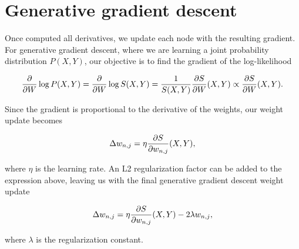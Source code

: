 \section{Generative gradient descent}

Once computed all derivatives, we update each node with the resulting gradient. For generative
gradient descent, where we are learning a joint probability distribution $P(X,Y)$, our objective is
to find the gradient of the log-likelihood

\begin{equation*}
  \frac{\partial}{\partial W}\log P(X,Y)=\frac{\partial}{\partial W}\log S(X,Y)=\frac{1}{S(X,Y)}\frac{\partial S}{\partial W}(X,Y)\propto
    \frac{\partial S}{\partial W}(X,Y).
\end{equation*}

Since the gradient is proportional to the derivative of the weights, our weight update becomes

\begin{equation*}
  \Delta w_{n,j}=\eta\frac{\partial S}{\partial w_{n,j}}(X, Y),
\end{equation*}

where $\eta$ is the learning rate. An L2 regularization factor can be added to the expression
above, leaving us with the final generative gradient descent weight update

\begin{equation}\label{eq:gen_weight_update}
  \Delta w_{n,j}=\eta\frac{\partial S}{\partial w_{n,j}}(X, Y)-2\lambda w_{n,j},
\end{equation}

where $\lambda$ is the regularization constant.
